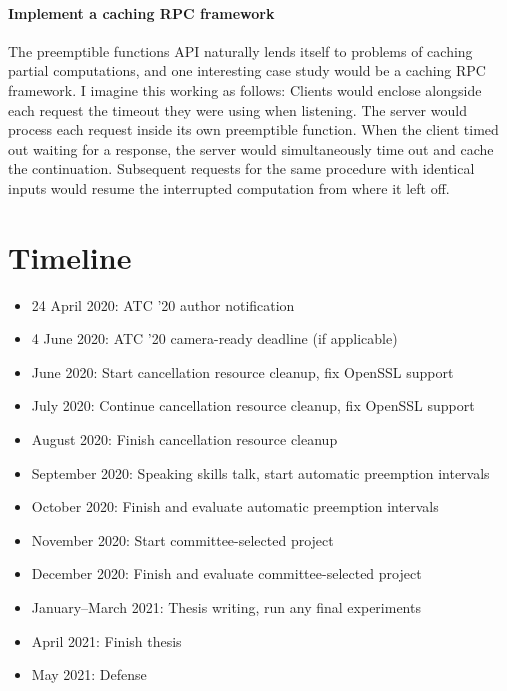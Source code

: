 \documentclass[12pt,letterpaper]{book}
\begin{document}
\paragraph{Implement a caching RPC framework}
The preemptible functions API naturally lends itself to problems of caching partial
computations, and one interesting case study would be a caching RPC framework.  I
imagine this working as follows:  Clients would enclose alongside each request the
timeout they were using when listening.  The server would process each request inside
its own preemptible function.  When the client timed out waiting for a response, the
server would simultaneously time out and cache the continuation.  Subsequent requests
for the same procedure with identical inputs would resume the interrupted computation
from where it left off.


\section{Timeline}

\begin{itemize}
\item 24 April 2020: ATC '20 author notification
\item 4 June 2020: ATC '20 camera-ready deadline (if applicable)
\item June 2020: Start cancellation resource cleanup, fix OpenSSL support
\item July 2020: Continue cancellation resource cleanup, fix OpenSSL support
\item August 2020: Finish cancellation resource cleanup
\item September 2020: Speaking skills talk, start automatic preemption intervals
\item October 2020: Finish and evaluate automatic preemption intervals
\item November 2020: Start committee-selected project
\item December 2020: Finish and evaluate committee-selected project
\item January--March 2021: Thesis writing, run any final experiments
\item April 2021: Finish thesis
\item May 2021: Defense
\end{itemize}


\cleardoublepage
{}

\end{document}
